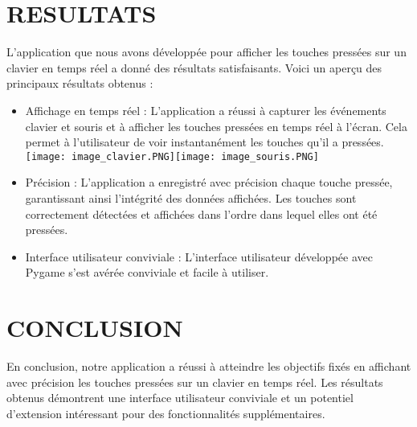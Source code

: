 \documentclass[12pt,a4paper]{article}
\begin{document}
\section{RESULTATS}
L'application que nous avons développée pour afficher les touches pressées sur un clavier en temps réel a donné des résultats satisfaisants. Voici un aperçu des principaux résultats obtenus :
\begin{itemize}

\item Affichage en temps réel : L'application a réussi à capturer les événements clavier et souris et à afficher les touches pressées en temps réel à l'écran. Cela permet à l'utilisateur de voir instantanément les touches qu'il a pressées.
\texttt{[image: image\_clavier.PNG]}\texttt{[image: image\_souris.PNG]}  
\item Précision : L'application a enregistré avec précision chaque touche pressée, garantissant ainsi l'intégrité des données affichées. Les touches sont correctement détectées et affichées dans l'ordre dans lequel elles ont été pressées.
\item Interface utilisateur conviviale : L'interface utilisateur développée avec Pygame s'est avérée conviviale et facile à utiliser.

\end{itemize}

\newpage
\section{CONCLUSION}
En conclusion, notre application a réussi à atteindre les objectifs fixés en affichant avec précision les touches pressées sur un clavier en temps réel. Les résultats obtenus démontrent une interface utilisateur conviviale et un potentiel d'extension intéressant pour des fonctionnalités supplémentaires.
\end{document}
